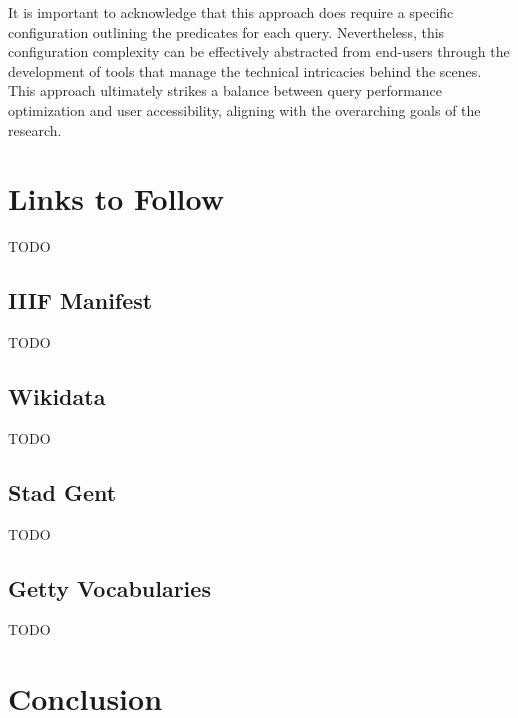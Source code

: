 It is important to acknowledge that this approach does require a specific configuration outlining the predicates for each query. Nevertheless, this configuration complexity can be effectively abstracted from end-users through the development of tools that manage the technical intricacies behind the scenes. This approach ultimately strikes a balance between query performance optimization and user accessibility, aligning with the overarching goals of the research.

\section{Links to Follow}
\label{sec:links_to_follow}

TODO

\subsection{IIIF Manifest}
\label{subsec:links_to_follow_manifest}

TODO

\subsection{Wikidata}

TODO

\subsection{Stad Gent}

TODO

\subsection{Getty Vocabularies}

TODO

\section{Conclusion}
\label{sec:coghent_link_traversal_conclusion}